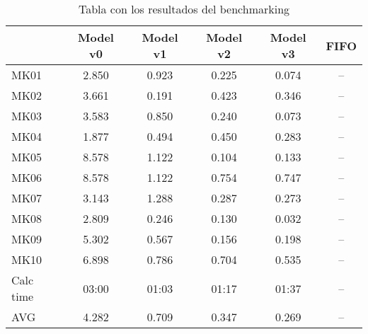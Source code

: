 \begin{table}[ht]
    \centering
    \begin{tabular}[ht]{|lcccc|c|}
        \hline
                  & Model v0 & Model v1 & Model v2 & Model v3 & FIFO \\
        \hline
        MK01      & 2.850    & 0.923    & 0.225    & 0.074    & --   \\
        MK02      & 3.661    & 0.191    & 0.423    & 0.346    & --   \\
        MK03      & 3.583    & 0.850    & 0.240    & 0.073    & --   \\
        MK04      & 1.877    & 0.494    & 0.450    & 0.283    & --   \\
        MK05      & 8.578    & 1.122    & 0.104    & 0.133    & --   \\
        MK06      & 8.578    & 1.122    & 0.754    & 0.747    & --   \\
        MK07      & 3.143    & 1.288    & 0.287    & 0.273    & --   \\
        MK08      & 2.809    & 0.246    & 0.130    & 0.032    & --   \\
        MK09      & 5.302    & 0.567    & 0.156    & 0.198    & --   \\
        MK10      & 6.898    & 0.786    & 0.704    & 0.535    & --   \\
        \hline
        Calc time & 03:00    & 01:03    & 01:17    & 01:37    & --   \\
        AVG       & 4.282    & 0.709    & 0.347    & 0.269    & --   \\
        \hline
    \end{tabular}
    \caption{Tabla con los resultados del benchmarking}
\end{table}
